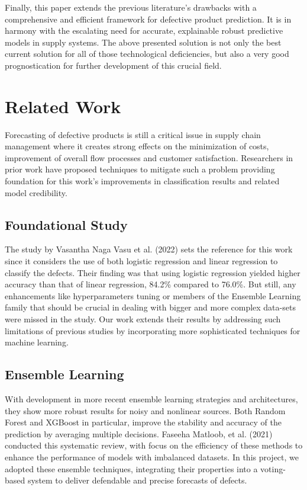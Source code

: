 \documentclass[conference]{IEEEtran}
\begin{document}
Finally, this paper extends the previous literature’s drawbacks with a comprehensive and efficient framework for defective product prediction. It is in harmony with the escalating need for accurate, explainable robust predictive models in supply systems. The above presented solution is not only the best current solution for all of those technological deficiencies, but also a very good prognostication for further development of this crucial field.

\section{Related Work}
Forecasting of defective products is still a critical issue in supply chain management where it creates strong effects on the minimization of costs, improvement of overall flow processes and customer satisfaction. Researchers in prior work have proposed techniques to mitigate such a problem providing foundation for this work’s improvements in classification results and related model credibility.

\subsection{Foundational Study}
The study by Vasantha Naga Vasu et al. (2022) \cite{vasu2022prediction} sets the reference for this work since it considers the use of both logistic regression and linear regression to classify the defects. Their finding was that using logistic regression yielded higher accuracy than that of linear regression, 84.2\% compared to 76.0\%. But still, any enhancements like hyperparameters tuning or members of the Ensemble Learning family that should be crucial in dealing with bigger and more complex data-sets were missed in the study. Our work extends their results by addressing such limitations of previous studies by incorporating more sophisticated techniques for machine learning.

\subsection{Ensemble Learning}
With development in more recent ensemble learning strategies and architectures, they show more robust results for noisy and nonlinear sources. Both Random Forest and XGBoost in particular, improve the stability and accuracy of the prediction by averaging multiple decisions. Faseeha Matloob, et al. (2021) \cite{matloob2021software} conducted this systematic review, with focus on the efficiency of these methods to enhance the performance of models with imbalanced datasets. In this project, we adopted these ensemble techniques, integrating their properties into a voting-based system to deliver defendable and precise forecasts of defects.
\end{document}
